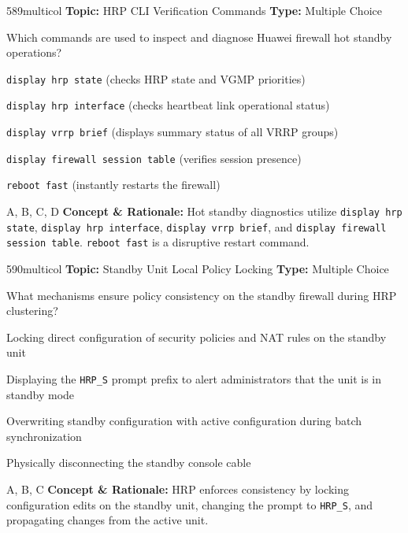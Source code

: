\begin{qcard}{589}{multicol}
\textcolor{darkslate!75}{\small\textbf{Topic:} HRP CLI Verification Commands \hfill \textbf{Type:} Multiple Choice}\vspace{0.4em}\par
Which commands are used to inspect and diagnose Huawei firewall hot standby operations?
\begin{qoptions}
\item \texttt{display hrp state} (checks HRP state and VGMP priorities)
\item \texttt{display hrp interface} (checks heartbeat link operational status)
\item \texttt{display vrrp brief} (displays summary status of all VRRP groups)
\item \texttt{display firewall session table} (verifies session presence)
\item \texttt{reboot fast} (instantly restarts the firewall)
\end{qoptions}
\end{qcard}
\nopagebreak
\begin{explainbox}{A, B, C, D}
\textbf{Concept \& Rationale:} Hot standby diagnostics utilize \texttt{display hrp state}, \texttt{display hrp interface}, \texttt{display vrrp brief}, and \texttt{display firewall session table}. \texttt{reboot fast} is a disruptive restart command.
\end{explainbox}

\begin{qcard}{590}{multicol}
\textcolor{darkslate!75}{\small\textbf{Topic:} Standby Unit Local Policy Locking \hfill \textbf{Type:} Multiple Choice}\vspace{0.4em}\par
What mechanisms ensure policy consistency on the standby firewall during HRP clustering?
\begin{qoptions}
\item Locking direct configuration of security policies and NAT rules on the standby unit
\item Displaying the \texttt{HRP\_S} prompt prefix to alert administrators that the unit is in standby mode
\item Overwriting standby configuration with active configuration during batch synchronization
\item Physically disconnecting the standby console cable
\end{qoptions}
\end{qcard}
\nopagebreak
\begin{explainbox}{A, B, C}
\textbf{Concept \& Rationale:} HRP enforces consistency by locking configuration edits on the standby unit, changing the prompt to \texttt{HRP\_S}, and propagating changes from the active unit.
\end{explainbox}


